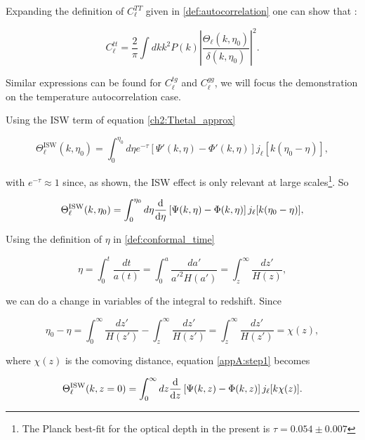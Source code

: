 \documentclass[openany,a4paper,12pt,oneside]{book}
\begin{document}
\begin{spacing}{1.5}
Expanding the definition of $C_\ell^{TT}$ given in \eqref{def:autocorrelation} one can show that \cite{dodelson2020modern}:

\begin{equation}\label{demo:Start_eq}
	C_\ell^{tt}=\frac{2}{\pi}\int dk k^2P(k)\left|\frac{\Theta_\ell(k,\eta_0)}{\delta(k,\eta_0)}\right|^2.
\end{equation}

Similar expressions can be found for $C_\ell^{tg}$ and $C_\ell^{gg}$, we will focus the demonstration on the temperature autocorrelation case.

Using the ISW term of equation \eqref{ch2:Thetal_approx}

\begin{equation}
	\Theta_\ell^{\text{ISW}}(k,\eta_0)=\int_0^{\eta_0} d\eta e^{-\tau}[\Psi'(k,\eta)-\Phi'(k,\eta)]j_\ell[k(\eta_0-\eta)],
\end{equation}

\noindent with $e^{-\tau}\approx 1$ since, as shown, the ISW effect is only relevant at large scales\footnote{The Planck best-fit for the optical depth in the present is $\tau=0.054\pm 0.007$}. So

\begin{equation}\label{appA:step1}
	\Theta_\ell^{\text{ISW}}(k,\eta_0)=\int_0^{\eta_0} d\eta \dv{}{\eta}\left[\Psi(k,\eta)-\Phi(k,\eta)\right]j_\ell[k(\eta_0-\eta)],
\end{equation}

Using the definition of $\eta$ in \eqref{def:conformal_time}

\begin{equation}
	\eta=\int_0^t \frac{dt}{a(t)}=\int_0^a\frac{da'}{a'^2H(a')}=\int_{z}^\infty \frac{dz'}{H(z)},
\end{equation}

\noindent we can do a change in variables of the integral to redshift. Since

\begin{equation}
	\eta_0-\eta=\int_0^\infty \frac{dz'}{H(z')}-\int_z^\infty \frac{dz'}{H(z')}=\int_z^\infty \frac{dz'}{H(z')}=\chi(z),
\end{equation}

\noindent where $\chi(z)$ is the comoving distance, equation \eqref{appA:step1} becomes

\begin{equation}
	\Theta_\ell^\text{ISW}(k,z=0)=\int_0^\infty dz \dv{}{z}\left[\Psi(k,z)-\Phi(k,z)\right]j_\ell[k\chi(z)].
\end{equation}


\end{spacing}
\end{document}
